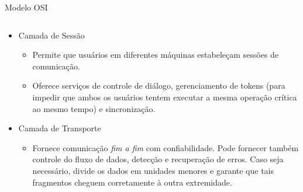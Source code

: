 \documentclass{libs/ufc_format}
\begin{document}
\begin{frame}{Modelo OSI}
\begin{columns}
        \begin{column}{0.65\textwidth}
            \begin{itemize}
                \item Camada de Sessão
                    \begin{itemize}
                        \justifying
                        \item<2> Permite que usuários em diferentes máquinas estabeleçam sessões de comunicação.
                        \item<2> Oferece serviços de controle de diálogo, gerenciamento de tokens (para impedir que ambos os usuários tentem executar a mesma operação crítica ao mesmo tempo) e sincronização.
                    \end{itemize}
                \item<3-> Camada de Transporte
                    \begin{itemize}
                        \justifying
                        \item<4> Fornece comunicação \textit{fim a fim} com confiabilidade. Pode fornecer também controle do fluxo de dados, detecção e recuperação de erros. Caso seja necessário, divide os dados em unidades menores e garante que tais fragmentos cheguem corretamente à outra extremidade.
                    \end{itemize}
            \end{itemize}
        \end{column}
    \end{columns}
\end{frame}
\end{document}

